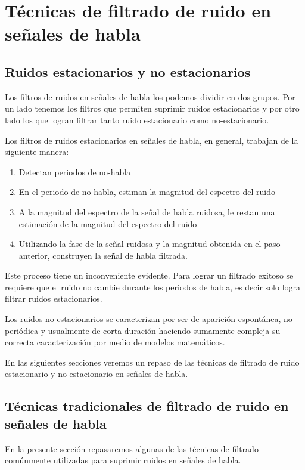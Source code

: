 \section{Técnicas de filtrado de ruido en señales de habla}

\subsection{Ruidos estacionarios y no estacionarios}

Los filtros de ruidos en señales de habla los podemos dividir en dos grupos. Por un lado tenemos los filtros que permiten suprimir ruidos estacionarios y por otro lado los que logran filtrar tanto ruido estacionario como no-estacionario.

Los filtros de ruidos estacionarios en señales de habla, en general, trabajan de la siguiente manera:

\begin{enumerate}
	\item Detectan periodos de no-habla
	\item En el periodo de no-habla, estiman la magnitud del espectro del ruido
	\item A la magnitud del espectro de la señal de habla ruidosa, le restan una estimación de la magnitud del espectro del ruido
	\item Utilizando la fase de la señal ruidosa y la magnitud obtenida en el paso anterior, construyen la señal de habla filtrada.
\end{enumerate}

Este proceso tiene un inconveniente evidente. Para lograr un filtrado exitoso se requiere que el ruido no cambie durante los periodos de habla, es decir solo logra filtrar ruidos estacionarios.

Los ruidos no-estacionarios se caracterizan por ser de aparición espontánea, no periódica y usualmente de corta duración haciendo sumamente compleja su correcta caracterización por medio de modelos matemáticos.

En las siguientes secciones veremos un repaso de las técnicas de filtrado de ruido estacionario y no-estacionario en señales de habla.

\subsection{Técnicas tradicionales de filtrado de ruido en señales de habla}

En la presente sección repasaremos algunas de las técnicas de filtrado comúnmente utilizadas para suprimir ruidos en señales de habla.

